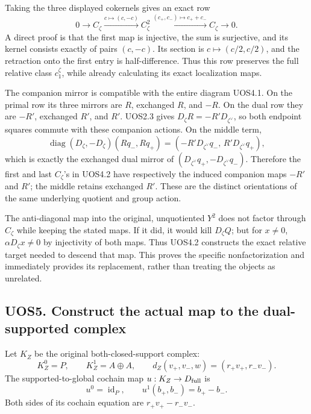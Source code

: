 Taking the three displayed cokernels gives an exact row \[
 \boxed{
 0\to C_\zeta\xrightarrow{c\mapsto(c,-c)}
 C_\zeta^2\xrightarrow{(c_+,c_-)\mapsto c_++c_-}
 C_\zeta\to0.}
 \tag{UOS4.2}
\] A direct proof is that the first map is injective, the sum is
surjective, and its kernel consists exactly of pairs \((c,-c)\). Its
section is \(c\mapsto(c/2,c/2)\), and the retraction onto the first
entry is half-difference. Thus this row preserves the full relative
class \(c_1^\zeta\), while already calculating its exact localization
maps.

The companion mirror is compatible with the entire diagram UOS4.1. On
the primal row its three mirrors are \(R\), exchanged \(R\), and \(-R\).
On the dual row they are \(-R'\), exchanged \(R'\), and \(R'\). UOS2.3
gives \(D_\zeta R=-R'D_{\zeta^\vee}\), so both endpoint squares commute
with these companion actions. On the middle term, \[
 \operatorname{diag}(D_\zeta,-D_\zeta)
       (Rq_-,Rq_+)
 =(-R'D_{\zeta^\vee}q_-,\,R'D_{\zeta^\vee}q_+),
\] which is exactly the exchanged dual mirror of
\((D_{\zeta^\vee}q_+,-D_{\zeta^\vee}q_-)\). Therefore the first and last
\(C_\zeta\)'s in UOS4.2 have respectively the induced companion maps
\(-R'\) and \(R'\); the middle retains exchanged \(R'\). These are the
distinct orientations of the same underlying quotient and group action.

The anti-diagonal map into the original, unquotiented \(Y^2\) does not
factor through \(C_\zeta\) while keeping the stated maps. If it did, it
would kill \(D_\zeta Q\); but for \(x\ne0\), \(\alpha D_\zeta x\ne0\) by
injectivity of both maps. Thus UOS4.2 constructs the exact relative
target needed to descend that map. This proves the specific
nonfactorization and immediately provides its replacement, rather than
treating the objects as unrelated.

\subsection{UOS5. Construct the actual map to the dual-supported
complex}\label{uos5.-construct-the-actual-map-to-the-dual-supported-complex}

Let \(K_Z\) be the original both-closed-support complex: \[
 K_Z^0=P,\qquad K_Z^1=A\oplus A,\qquad
 d_Z(v_+,v_-,w)=(r_+v_+,r_-v_-).
 \tag{UOS5.1}
\] The supported-to-global cochain map \(u:K_Z\to D_{\rm full}\) is \[
 u^0=\operatorname{id}_P,\qquad
 u^1(b_+,b_-)=b_+-b_-.
\] Both sides of its cochain equation are \(r_+v_+-r_-v_-\).

